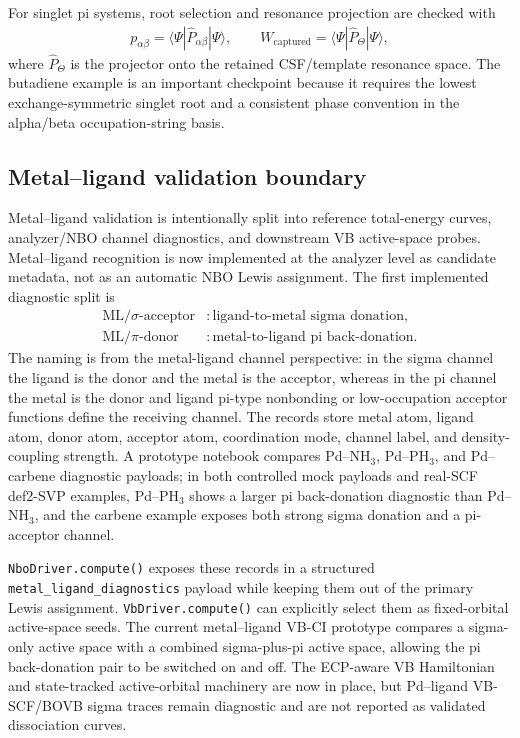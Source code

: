 \documentclass[11pt]{article}
\begin{document}
For singlet pi systems, root selection and resonance projection are checked with
\begin{equation}
\begin{aligned}
	p_{\alpha\beta}
	= \langle\Psi|\hat{P}_{\alpha\beta}|\Psi\rangle,
	\qquad
	W_{\mathrm{captured}}
	= \langle\Psi|\hat{P}_{\Theta}|\Psi\rangle,
\end{aligned}
\end{equation}
where $\hat{P}_{\Theta}$ is the projector onto the retained CSF/template resonance space.  The butadiene example is an important checkpoint because it requires the lowest exchange-symmetric singlet root and a consistent phase convention in the alpha/beta occupation-string basis.

\subsection{Metal--ligand validation boundary}

Metal--ligand validation is intentionally split into reference total-energy curves, analyzer/NBO channel diagnostics, and downstream VB active-space probes.  Metal--ligand recognition is now implemented at the analyzer level as candidate metadata, not as an automatic NBO Lewis assignment.  The first implemented diagnostic split is
\begin{equation}
\begin{aligned}
	\mathrm{ML}/\sigma\text{-acceptor}
	&: \text{ligand-to-metal sigma donation}, \\
	\mathrm{ML}/\pi\text{-donor}
	&: \text{metal-to-ligand pi back-donation}.
\end{aligned}
\end{equation}
The naming is from the metal-ligand channel perspective: in the sigma channel the ligand is the donor and the metal is the acceptor, whereas in the pi channel the metal is the donor and ligand pi-type nonbonding or low-occupation acceptor functions define the receiving channel.  The records store metal atom, ligand atom, donor atom, acceptor atom, coordination mode, channel label, and density-coupling strength.  A prototype notebook compares Pd--NH$_3$, Pd--PH$_3$, and Pd--carbene diagnostic payloads; in both controlled mock payloads and real-SCF def2-SVP examples, Pd--PH$_3$ shows a larger pi back-donation diagnostic than Pd--NH$_3$, and the carbene example exposes both strong sigma donation and a pi-acceptor channel.

\texttt{NboDriver.compute()} exposes these records in a structured \texttt{metal\_ligand\_diagnostics} payload while keeping them out of the primary Lewis assignment.  \texttt{VbDriver.compute()} can explicitly select them as fixed-orbital active-space seeds.  The current metal--ligand VB-CI prototype compares a sigma-only active space with a combined sigma-plus-pi active space, allowing the pi back-donation pair to be switched on and off.  The ECP-aware VB Hamiltonian and state-tracked active-orbital machinery are now in place, but Pd--ligand VB-SCF/BOVB sigma traces remain diagnostic and are not reported as validated dissociation curves.
\end{document}
